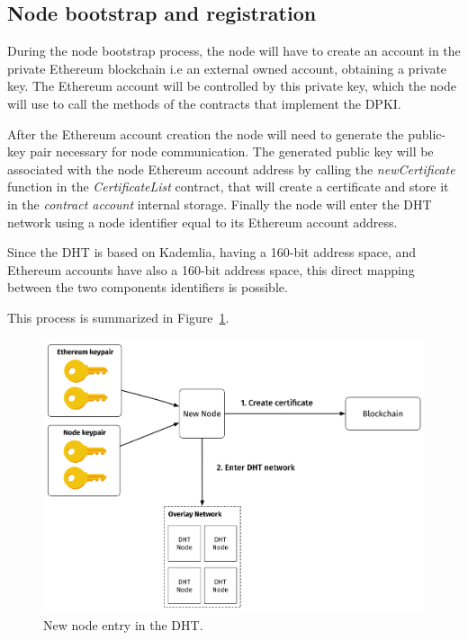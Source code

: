 \subsection{Node bootstrap and registration}
During the node bootstrap process, the node will have to create an account in the private Ethereum blockchain i.e an external owned account, obtaining a private key.
The Ethereum account will be controlled by this private key, which the node will use to call the methods of the contracts that implement the DPKI.

After the Ethereum account creation the node will need to generate the public-key pair necessary for node communication.
The generated public key will be associated with the node Ethereum account address by calling the \textit{newCertificate} function in the \textit{CertificateList} contract, that will create a certificate and store it in the \textit{contract account} internal storage.
Finally the node will enter the DHT network using a node identifier equal to its Ethereum account address.

Since the DHT is based on Kademlia, having a 160-bit address space, and Ethereum accounts have also a 160-bit address space, this direct mapping between the two components identifiers is possible.

This process is summarized in Figure~\ref{fig:new-node}.

\begin{figure}
    \includegraphics[width=\linewidth]{Figures/new-node.png}
    \caption{New node entry in the DHT.}
    \label{fig:new-node}
\end{figure}

